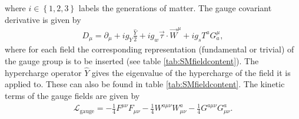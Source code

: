 where $i \in \left\{1,2,3\right\}$ labels the generations of matter. The gauge covariant derivative is given by
\begin{align}
D_\mu = \partial_\mu + i g_Y\frac{\hat{Y}}{2} +ig_w \vec{\tau}\cdot \vec{W}^\mu + i g_s T^a G_a^\mu,
\end{align}
where for each field the corresponding representation (fundamental or trivial) of the gauge group is to be inserted (see table \ref{tab:SMfieldcontent}). The hypercharge operator $\hat{Y}$ gives the eigenvalue of the hypercharge of the field it is applied to. These can also be found in table \ref{tab:SMfieldcontent}.
The kinetic terms of the gauge fields are given by
\begin{align}
\mathcal{L}_{\mathrm{gauge}} = -\frac{1}{4}F^{\mu\nu}F_{\mu\nu} - \frac{1}{4}W^{a\mu\nu}W^a_{\mu\nu} - \frac{1}{4}G^{a\mu\nu}G^a_{\mu\nu}.
\end{align}


